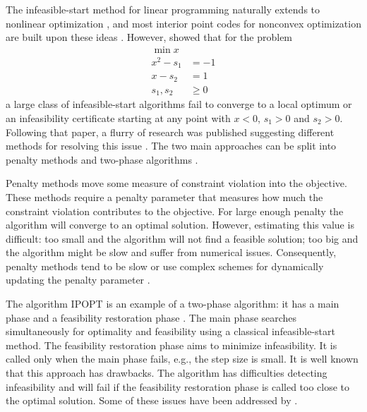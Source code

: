\documentclass{article}
\begin{document}

The infeasible-start method for linear programming \cite{lustig1990feasibility} naturally extends to nonlinear optimization \cite{kortanek1997infeasible},
and most interior point codes for nonconvex optimization are built upon these ideas \cite{byrd2006knitro,vanderbei1999loqo,wachter2006implementation}. However, \citet*{wachter2000failure} showed that for the problem
\begin{subequations}\label{failure-ex}
\begin{flalign}
\min { x }\\
x^2 - s_{1} &= -1 \\
x - s_{2} &= 1 \\
s_1, s_2 &\ge 0
\end{flalign}
\end{subequations}
a large class of infeasible-start algorithms fail to converge to a local optimum or an infeasibility certificate starting at any point with $x < 0$, $s_{1} > 0$ and $s_{2} > 0$. Following that paper, a flurry of research was published suggesting different methods for resolving this issue \cite{benson2004interior,chen2006interior,curtis2012penalty,gould2015interior,liu2004robust,wachter2006implementation}. The two main approaches can be split into penalty methods \cite{chen2006interior,curtis2012penalty,gould2015interior,liu2004robust} and two-phase algorithms \cite{wachter2006implementation}. 

Penalty methods move some measure of constraint violation into the objective. These methods require a penalty parameter that measures how much the constraint violation contributes to the objective. For large enough penalty the algorithm will converge to an optimal solution. However, estimating this value is difficult: too small and the algorithm will not find a feasible solution; too big and the algorithm might be slow and suffer from numerical issues. Consequently, penalty methods tend to be slow \cite[Algorithm 1]{curtis2012penalty} or use complex schemes for dynamically updating the penalty parameter \cite[Algorithm 2]{curtis2012penalty}. 

The algorithm IPOPT is an example of a two-phase algorithm: it has a main phase and a feasibility restoration phase  \cite{wachter2006implementation}. The main phase searches simultaneously for optimality and feasibility using a classical infeasible-start method. The feasibility restoration phase aims to minimize infeasibility. It is called only when the main phase fails, e.g., the step size is small. It is well known that this approach has drawbacks. The algorithm has difficulties detecting infeasibility \cite[Table 15]{huang2016solution} and will fail if the feasibility restoration phase is called too close to the optimal solution. Some of these issues have been addressed by \citet*{nocedal2014interior}. 
\end{document}
